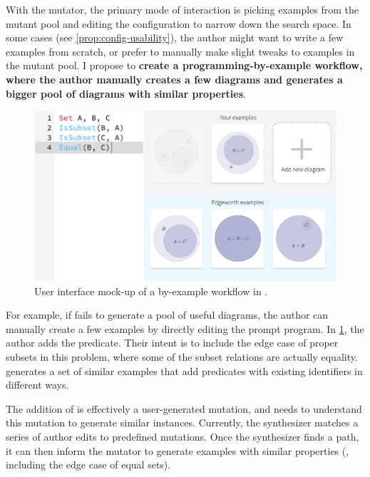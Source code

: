 With the \Edgeworth mutator, the primary mode of interaction is picking examples from the mutant pool and editing the configuration to narrow down the search space. In some cases (see \cref{prop:config-usability}), the author might want to write a few examples from scratch, or prefer to manually make slight tweaks to examples in the mutant pool. I propose to \textbf{create a programming-by-example workflow, where the author manually creates a few diagrams and \Edgeworth generates a bigger pool of diagrams with similar properties}.

\vspace{10pt}
\begin{figure}[h]
    \centering
    \includegraphics[width=\linewidth]{assets/chapter-3/synthesis-driven-workflow.pdf}
    \caption{User interface mock-up of a by-example workflow in \Edgeworth.}
    \label{fig:synthesis-driven-workflow}
\end{figure}
\vspace{10pt}

For example, if \Edgeworth fails to generate a pool of useful diagrams, the author can manually create a few examples by directly editing the prompt program. In \cref{fig:synthesis-driven-workflow}, the author adds the  predicate. Their intent is to include the edge case of proper subsets in this problem, where some of the subset relations are actually equality. \Edgeworth generates a set of similar examples that add  predicates with existing identifiers in different ways. 

The addition of  is effectively a user-generated mutation, and \Edgeworth needs to understand this mutation to generate similar instances. Currently, the \Edgeworth synthesizer matches a series of author edits to predefined mutations. Once the synthesizer finds a path, it can then inform the mutator to generate examples with similar properties (\ie, including the edge case of equal sets). 

